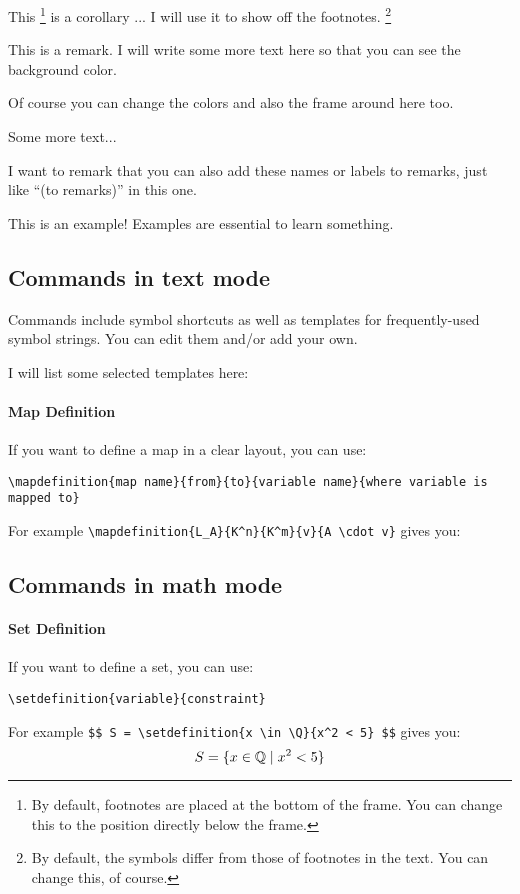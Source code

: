 \begin{corollary}
  This \footnote{By default, footnotes are placed at the bottom of the frame. You can change this to the position directly below the frame.} is a corollary ...
  I will use it to show off the footnotes. \footnote{By default, the symbols differ from those of footnotes in the text. You can change this, of course.}
\end{corollary}

\begin{remark}
  This is a remark. I will write some more text here so that you can see the background color.

  Of course you can change the colors and also the frame around here too.

  Some more text...
\end{remark}

\begin{remark}[to remarks]
  I want to remark that you can also add these names or labels to remarks, just like ``(to remarks)'' in this one.
\end{remark}

\begin{example}
  This is an example! Examples are essential to learn something.
\end{example}

\subsection{Commands in text mode}

Commands include symbol shortcuts as well as templates for frequently-used symbol strings. You can edit them and/or add your own.

I will list some selected templates here:

\paragraph{Map Definition}

If you want to define a map in a clear layout, you can use:
\begin{center}\verb|\mapdefinition{map name}{from}{to}{variable name}{where variable is mapped to}|\end{center}
For example \verb|\mapdefinition{L_A}{K^n}{K^m}{v}{A \cdot v}| gives you:

\subsection{Commands in math mode}

\paragraph{Set Definition}

If you want to define a set, you can use:
\begin{center}\verb|\setdefinition{variable}{constraint}|\end{center}
For example \verb|$$ S = \setdefinition{x \in \Q}{x^2 < 5} $$| gives you:
$$ S = \{x \in \mathbb{Q} \mid x^2 < 5\} $$


